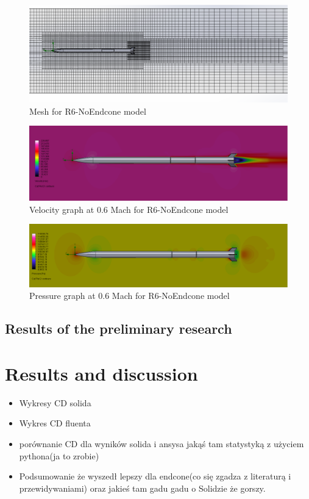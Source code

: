 \documentclass{article}
\begin{document}
\begin{figure}[H]
    \centering
    \includegraphics[width=\textwidth]{../data/R6-NoEndcone-Solid/mesh.png}
    \caption{Mesh for R6-NoEndcone model}
\end{figure}
\begin{figure}[H]
    \centering
    \includegraphics[width=\textwidth]{../data/R6-NoEndcone-Solid/speed.png}
    \caption{Velocity graph at 0.6 Mach for R6-NoEndcone model}
\end{figure}

\begin{figure}[H]
    \centering
    \includegraphics[width=\textwidth]{../data/R6-NoEndcone-Solid/konospeedoatode.png}
    \caption{Pressure graph at 0.6 Mach for R6-NoEndcone model}
\end{figure}

\subsection{Results of the preliminary research}


\section{Results and discussion}
\begin{itemize}
    \item Wykresy CD solida
    \item Wykres CD fluenta
    \item porównanie CD dla wyników solida i ansysa jakąś tam statystyką z użyciem pythona(ja to zrobie)
    \item Podsumowanie że wyszedł lepszy dla endcone(co się zgadza z literaturą i przewidywaniami) 
    oraz jakieś tam gadu gadu o Solidzie że gorszy. 
\end{itemize}
\end{document}
